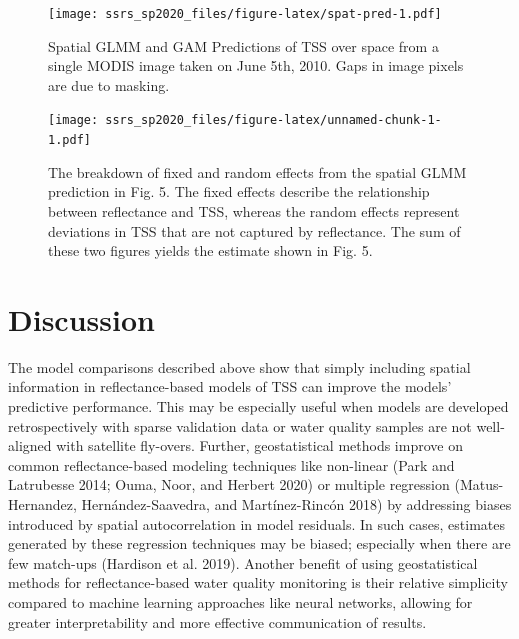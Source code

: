 \documentclass[11pt,]{article}
\begin{document}
\begin{figure}
\centering
\texttt{[image: ssrs\_sp2020\_files/figure-latex/spat-pred-1.pdf]}
\caption{Spatial GLMM and GAM Predictions of TSS over space from a
single MODIS image taken on June 5th, 2010. Gaps in image pixels are due
to masking.}
\end{figure}

\begin{figure}
\centering
\texttt{[image: ssrs\_sp2020\_files/figure-latex/unnamed-chunk-1-1.pdf]}
\caption{The breakdown of fixed and random effects from the spatial GLMM
prediction in Fig. 5. The fixed effects describe the relationship
between reflectance and TSS, whereas the random effects represent
deviations in TSS that are not captured by reflectance. The sum of these
two figures yields the estimate shown in Fig. 5.}
\end{figure}

\hypertarget{discussion}{%
\section{Discussion}\label{discussion}}

The model comparisons described above show that simply including spatial
information in reflectance-based models of TSS can improve the models'
predictive performance. This may be especially useful when models are
developed retrospectively with sparse validation data or water quality
samples are not well-aligned with satellite fly-overs. Further,
geostatistical methods improve on common reflectance-based modeling
techniques like non-linear (Park and Latrubesse 2014; Ouma, Noor, and
Herbert 2020) or multiple regression (Matus-Hernandez,
Hernández-Saavedra, and Martínez-Rincón 2018) by addressing biases
introduced by spatial autocorrelation in model residuals. In such cases,
estimates generated by these regression techniques may be biased;
especially when there are few match-ups (Hardison et al. 2019). Another
benefit of using geostatistical methods for reflectance-based water
quality monitoring is their relative simplicity compared to machine
learning approaches like neural networks, allowing for greater
interpretability and more effective communication of results.
\end{document}
